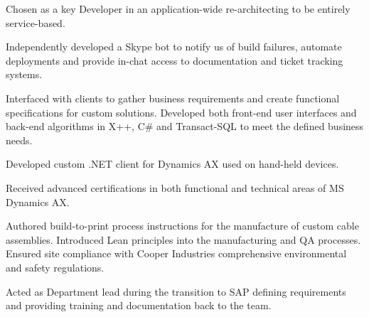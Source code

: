     \begin{reslist}
        \item{Chosen as a key Developer in an application-wide
              re-architecting to be entirely service-based.}
        \item{Independently developed a Skype bot to notify us of build
              failures, automate deployments and provide in-chat access
              to documentation and ticket tracking systems.}
    \end{reslist}


    Interfaced with clients to gather business requirements and create
    functional specifications for custom solutions. Developed both
    front-end user interfaces and back-end algorithms in X++, C\# and
    Transact-SQL to meet the defined business needs.

    \begin{reslist}
        \item{Developed custom .NET client for Dynamics AX used on
              hand-held devices.}
        \item{Received advanced certifications in both functional and
              technical areas of MS Dynamics AX.}
    \end{reslist}


    Authored build-to-print process instructions for the manufacture of
    custom cable assemblies. Introduced Lean principles into the
    manufacturing and QA processes. Ensured site compliance with Cooper
    Industries comprehensive environmental and safety regulations.

    \begin{reslist}
        \item{Acted as Department lead during the transition to SAP
              defining requirements and providing training and
              documentation back to the team.}
    \end{reslist}



